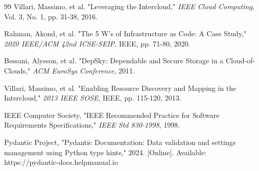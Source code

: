\begin{thebibliography}{99}
     Villari, Massimo, et al. "Leveraging the Intercloud," \textit{IEEE Cloud Computing}, Vol. 3, No. 1, pp. 31-38, 2016.

     Rahman, Akond, et al. "The 5 W’s of Infrastructure as Code: A Case Study," \textit{2020 IEEE/ACM 42nd ICSE-SEIP}, IEEE, pp. 71-80, 2020.

     Bessani, Alysson, et al. "DepSky: Dependable and Secure Storage in a Cloud-of-Clouds," \textit{ACM EuroSys Conference}, 2011.

     Villari, Massimo, et al. "Enabling Resource Discovery and Mapping in the Intercloud," \textit{2013 IEEE SOSE}, IEEE, pp. 115-120, 2013.

     IEEE Computer Society, "IEEE Recommended Practice for Software Requirements Specifications," \textit{IEEE Std 830-1998}, 1998.

     Pydantic Project, "Pydantic Documentation: Data validation and settings management using Python type hints," 2024. [Online]. Available: https://pydantic-docs.helpmanual.io

\end{thebibliography}

